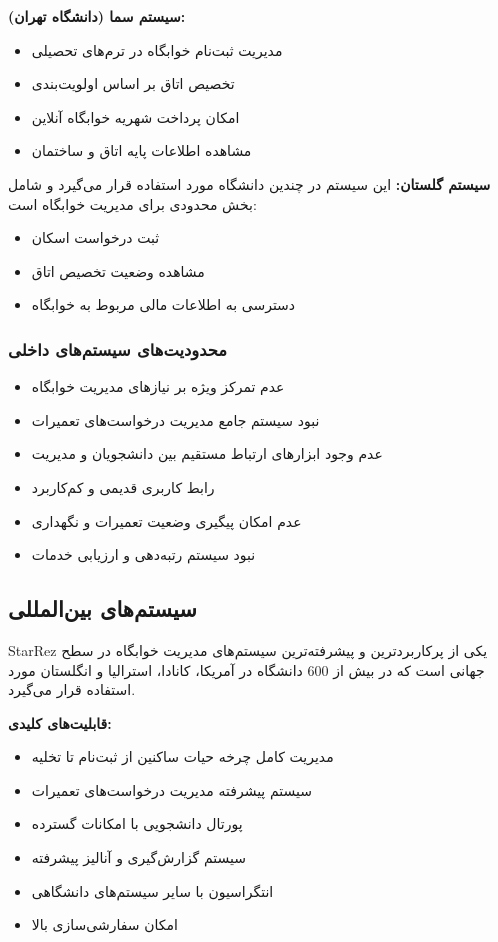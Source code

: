 \documentclass[12pt,a4paper]{report}
\begin{document}
	\textbf{سیستم سما (دانشگاه تهران):}
	\begin{itemize}
		\item مدیریت ثبت‌نام خوابگاه در ترم‌های تحصیلی
		\item تخصیص اتاق بر اساس اولویت‌بندی
		\item امکان پرداخت شهریه خوابگاه آنلاین
		\item مشاهده اطلاعات پایه اتاق و ساختمان
	\end{itemize}
	
	\textbf{سیستم گلستان:}
	این سیستم در چندین دانشگاه مورد استفاده قرار می‌گیرد و شامل بخش محدودی برای مدیریت خوابگاه است:
	\begin{itemize}
		\item ثبت درخواست اسکان
		\item مشاهده وضعیت تخصیص اتاق
		\item دسترسی به اطلاعات مالی مربوط به خوابگاه
	\end{itemize}
	
	\subsubsection*{محدودیت‌های سیستم‌های داخلی}
	\begin{itemize}
		\item عدم تمرکز ویژه بر نیازهای مدیریت خوابگاه
		\item نبود سیستم جامع مدیریت درخواست‌های تعمیرات
		\item عدم وجود ابزارهای ارتباط مستقیم بین دانشجویان و مدیریت
		\item رابط کاربری قدیمی و کم‌کاربرد
		\item عدم امکان پیگیری وضعیت تعمیرات و نگهداری
		\item نبود سیستم رتبه‌دهی و ارزیابی خدمات
	\end{itemize}
	
	\subsection{سیستم‌های بین‌المللی}
	
	StarRez یکی از پرکاربردترین و پیشرفته‌ترین سیستم‌های مدیریت خوابگاه در سطح جهانی است که در بیش از 600 دانشگاه در آمریکا، کانادا، استرالیا و انگلستان مورد استفاده قرار می‌گیرد.
	
	\textbf{قابلیت‌های کلیدی:}
	\begin{itemize}
		\item مدیریت کامل چرخه حیات ساکنین از ثبت‌نام تا تخلیه
		\item سیستم پیشرفته مدیریت درخواست‌های تعمیرات
		\item پورتال دانشجویی با امکانات گسترده
		\item سیستم گزارش‌گیری و آنالیز پیشرفته
		\item انتگراسیون با سایر سیستم‌های دانشگاهی
		\item امکان سفارشی‌سازی بالا
	\end{itemize}
	
\end{document}
